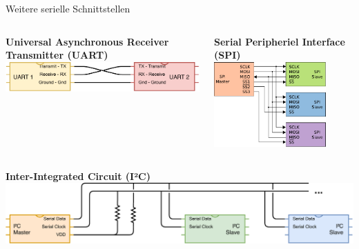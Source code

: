 {
\small

\begin{frame}{Weitere serielle Schnittstellen}
    \begin{columns}
        \textbf{Universal Asynchronous Receiver Transmitter (UART)} \\
        \smallskip
        \includegraphics[width=\textwidth]{2-hardwaredesign/img/seriell_uart_schaltplan}

        \textbf{Serial Peripheriel Interface (SPI)} \\
        \smallskip
        \includegraphics[width=0.8\textwidth]{2-hardwaredesign/img/seriell_spi_schaltplan}
    \end{columns}

    \medskip

    \textbf{Inter-Integrated Circuit (I²C)} \\
    \smallskip
    \includegraphics[width=\textwidth]{2-hardwaredesign/img/seriell_i2c_schaltplan}
\end{frame}
}

